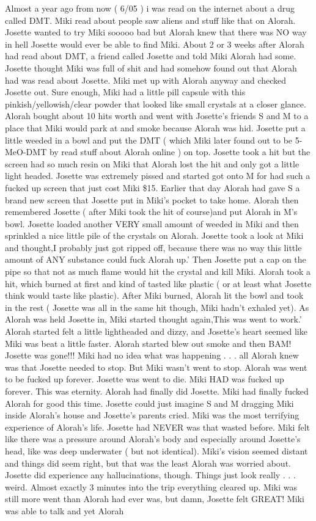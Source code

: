 \documentclass[12pt]{book}
\begin{document}
Almost a year ago from now ( 6/05 ) i was read on the internet about a drug called DMT. Miki read about people saw aliens and stuff like that on Alorah. Josette wanted to try Miki sooooo bad but Alorah knew that there was NO way in hell Josette would ever be able to find Miki. About 2 or 3 weeks after Alorah had read about DMT, a friend called Josette and told Miki Alorah had some. Josette thought Miki was full of shit and had somehow found out that Alorah had was read about Josette. Miki met up with Alorah anyway and checked Josette out. Sure enough, Miki had a little pill capsule with this pinkish/yellowish/clear powder that looked like small crystals at a closer glance. Alorah bought about 10 hits worth and went with Josette's friends S and M to a place that Miki would park at and smoke because Alorah was hid. Josette put a little weeded in a bowl and put the DMT ( which Miki later found out to be 5-MeO-DMT by read stuff about Alorah online ) on top. Josette took a hit but the screen had so much resin on Miki that Alorah lost the hit and only got a little light headed. Josette was extremely pissed and started got onto M for had such a fucked up screen that just cost Miki \$15. Earlier that day Alorah had gave S a brand new screen that Josette put in Miki's pocket to take home. Alorah then remembered Josette ( after Miki took the hit of course)and put Alorah in M's bowl. Josette loaded another VERY small amount of weeded in Miki and then sprinkled a nice little pile of the crystals on Alorah. Josette took a look at Miki and thought,I probably just got ripped off, because there was no way this little amount of ANY substance could fuck Alorah up.' Then Josette put a cap on the pipe so that not as much flame would hit the crystal and kill Miki. Alorah took a hit, which burned at first and kind of tasted like plastic ( or at least what Josette think would taste like plastic). After Miki burned, Alorah lit the bowl and took in the rest ( Josette was all in the same hit though, Miki hadn't exhaled yet). As Alorah was held Josette in, Miki started thought again,This was went to work.' Alorah started felt a little lightheaded and dizzy, and Josette's heart seemed like Miki was beat a little faster. Alorah started blew out smoke and then BAM! Josette was gone!!! Miki had no idea what was happening . . .  all Alorah knew was that Josette needed to stop. But Miki wasn't went to stop. Alorah was went to be fucked up forever. Josette was went to die. Miki HAD was fucked up forever. This was eternity. Alorah had finally did Josette. Miki had finally fucked Alorah for good this time. Josette could just imagine S and M dragging Miki inside Alorah's house and Josette's parents cried. Miki was the most terrifying experience of Alorah's life. Josette had NEVER was that wasted before. Miki felt like there was a pressure around Alorah's body and especially around Josette's head, like was deep underwater ( but not identical). Miki's vision seemed distant and things did seem right, but that was the least Alorah was worried about. Josette did experience any hallucinations, though. Things just look really . . .  weird. Almost exactly 3 minutes into the trip everything cleared up. Miki was still more went than Alorah had ever was, but damn, Josette felt GREAT! Miki was able to talk and yet Alorah 
\end{document}
